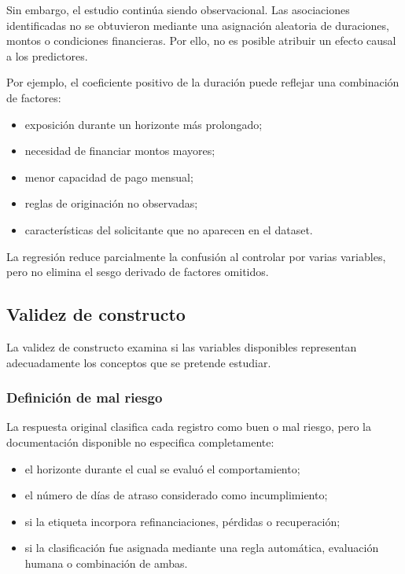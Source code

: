 Sin embargo, el estudio continúa siendo observacional. Las asociaciones
identificadas no se obtuvieron mediante una asignación aleatoria de
duraciones, montos o condiciones financieras. Por ello, no es posible
atribuir un efecto causal a los predictores.

Por ejemplo, el coeficiente positivo de la duración puede reflejar una
combinación de factores:

\begin{itemize}
    \item exposición durante un horizonte más prolongado;

    \item necesidad de financiar montos mayores;

    \item menor capacidad de pago mensual;

    \item reglas de originación no observadas;

    \item características del solicitante que no aparecen en el dataset.
\end{itemize}

La regresión reduce parcialmente la confusión al controlar por varias
variables, pero no elimina el sesgo derivado de factores omitidos.

\subsection{Validez de constructo}

La validez de constructo examina si las variables disponibles representan
adecuadamente los conceptos que se pretende estudiar.

\subsubsection{Definición de mal riesgo}

La respuesta original clasifica cada registro como buen o mal riesgo, pero
la documentación disponible no especifica completamente:

\begin{itemize}
    \item el horizonte durante el cual se evaluó el comportamiento;

    \item el número de días de atraso considerado como incumplimiento;

    \item si la etiqueta incorpora refinanciaciones, pérdidas o
    recuperación;

    \item si la clasificación fue asignada mediante una regla automática,
    evaluación humana o combinación de ambas.
\end{itemize}

